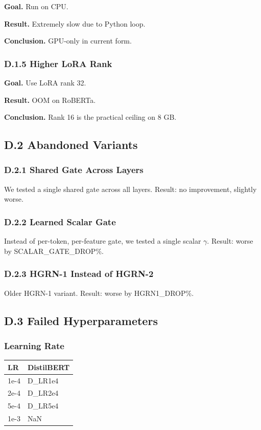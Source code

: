 \textbf{Goal.} Run on CPU.

\textbf{Result.} Extremely slow due to Python loop.

\textbf{Conclusion.} GPU-only in current form.

\subsubsection{D.1.5 Higher LoRA Rank}

\textbf{Goal.} Use LoRA rank 32.

\textbf{Result.} OOM on RoBERTa.

\textbf{Conclusion.} Rank 16 is the practical ceiling on 8 GB.

\subsection{D.2 Abandoned Variants}

\subsubsection{D.2.1 Shared Gate Across Layers}

We tested a single shared gate across all layers. Result: no improvement, 
slightly worse.

\subsubsection{D.2.2 Learned Scalar Gate}

Instead of per-token, per-feature gate, we tested a single scalar $\gamma$. Result: 
worse by {{SCALAR\_GATE\_DROP}}\%.

\subsubsection{D.2.3 HGRN-1 Instead of HGRN-2}

Older HGRN-1 variant. Result: worse by {{HGRN1\_DROP}}\%.

\subsection{D.3 Failed Hyperparameters}

\subsubsection{Learning Rate}

\begin{table}[H]
\centering
\small
\begin{tabular}{ll}
\toprule
\textbf{LR} & \textbf{DistilBERT} \\
\midrule
1e-4 & {{D\_LR1e4}} \\
2e-4 & {{D\_LR2e4}} \\
5e-4 & {{D\_LR5e4}} \\
1e-3 & NaN \\
\bottomrule
\end{tabular}
\end{table}

